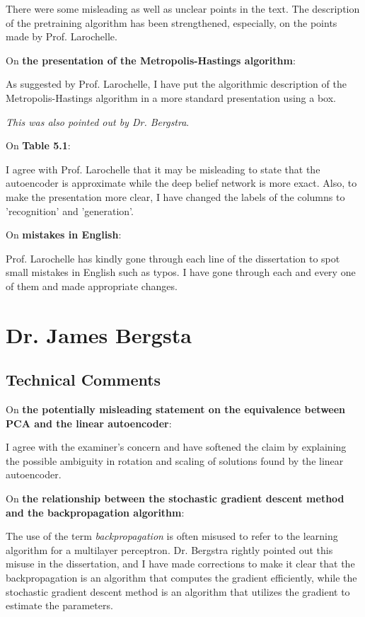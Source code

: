 \documentclass[11pt, oneside]{essay}
\begin{document}
There were some misleading as well as unclear
points in the text. The description of the pretraining
algorithm has been strengthened, especially, on the points
made by Prof. Larochelle.

On \textbf{the presentation of the Metropolis-Hastings
algorithm}:

As suggested by Prof. Larochelle, I have put the algorithmic
description of the Metropolis-Hastings algorithm in a more
standard presentation using a box.

\textit{This was also pointed out by Dr. Bergstra}.

On \textbf{Table 5.1}:

I agree with Prof. Larochelle that it may be misleading to
state that the autoencoder is approximate while the deep
belief network is more exact. Also, to make the presentation
more clear, I have changed the labels of the columns to
'recognition' and 'generation'.

On \textbf{mistakes in English}:

Prof. Larochelle has kindly gone through each line of the
dissertation to spot small mistakes in English such as
typos. I have gone through each and every one of them and
made appropriate changes.


\newpage
\section{Dr. James Bergsta}

\subsection{Technical Comments}

On \textbf{the potentially misleading statement on the
equivalence between PCA and the linear autoencoder}:

I agree with the examiner's concern and have softened the
claim by explaining the possible ambiguity in rotation and
scaling of solutions found by the linear autoencoder.

On \textbf{the relationship between the stochastic gradient
descent method and the backpropagation algorithm}:

The use of the term \textit{backpropagation} is often
misused to refer to the learning algorithm for a multilayer
perceptron. Dr. Bergstra rightly pointed out this misuse in
the dissertation, and I have made corrections to make it
clear that the backpropagation is an algorithm that computes
the gradient efficiently, while the stochastic gradient
descent method is an algorithm that utilizes the gradient
to estimate the parameters.
\end{document}
